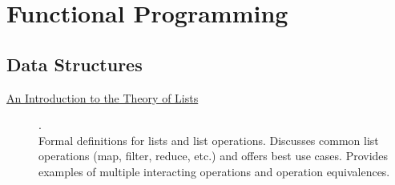 \chapter {Functional Programming}

\section{Data Structures}

\begin{description}
    \item[\href{https://www.cs.ox.ac.uk/files/3378/PRG56.pdf}{An Introduction to the Theory of Lists}] {\cite{bird1987introduction}.
          \\ Formal definitions for lists and list operations. Discusses common list operations (map, filter, reduce, etc.) and offers best use cases. Provides examples of multiple interacting operations and operation equivalences.
          \\ }
\end{description}

